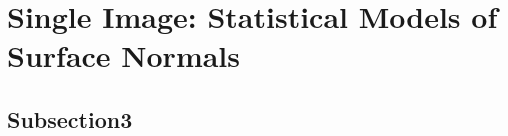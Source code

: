 \chapter{Single Image: Statistical Models of Surface Normals}\label{ch:singl_imag}
\minitoc{}



\section{Subsection3}
\lipsum[1]
\stopcontents[chapters]
